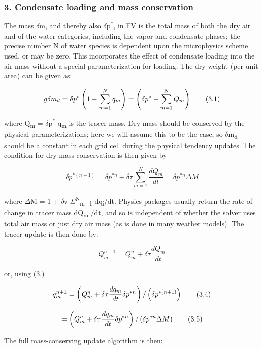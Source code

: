 \subsubsection*{3. Condensate loading and mass conservation}

The mass {$\delta$}m, and thereby also {$\delta$}p\textsuperscript{$\ast$}, in FV\textthreesuperior{} is the total mass of both the dry air and of the water categories, including the vapor and condensate phases; the precise number N of water species is dependent upon the microphysics scheme used, or may be zero. This incorporates the effect of condensate loading into the air mass without a special parameterization for loading. The dry weight (per unit area) can be given as\+:

\[ g \delta m_d = \delta p^* \left( 1 - \sum_{m=1}^N q_m \right) = \left( \delta p^* - \sum_{m=1}^N Q_m \right) \\ \tag {3.1} \]

where Q\textsubscript{m} = {$\delta$}p\textsuperscript{$\ast$} q\textsubscript{m} is the tracer mass. Dry mass should be conserved by the physical parameterizations; here we will assume this to be the case, so {$\delta$}m\textsubscript{d} should be a constant in each grid cell during the physical tendency updates. The condition for dry mass conservation is then given by

\[ \delta p^{*(n+1)} = \delta p^{*n} + \delta \tau \sum_{m=1}^N \frac{dQ_m}{dt} = \delta p^{*n} \Delta M \tag {3.2} \]

where {$\Delta$}M = 1 + {$\delta$}{$\tau$} {$\Sigma$}\textsuperscript{N}\textsubscript{m=1} dq\textsubscript{i}/dt. Physics packages usually return the rate of change in tracer mass dQ\textsubscript{m} /dt, and so is independent of whether the solver uses total air mass or just dry air mass (as is done in many weather models). The tracer update is then done by\+:

\[ Q^{n+1}_m = Q^n_m + \delta \tau \frac{dQ_m}{dt} \tag {3.3} \]

or, using (3.)

\[ q^{n+1}_m = \left( Q^n_m + \delta \tau \frac{dq_m}{dt} \delta p^{*n} \right) / \left( \delta p^{*(n+1)} \right) \\ \tag {3.4} \]

\[ = \left( Q^n_m + \delta \tau \frac{dq_m}{dt}\delta p^{*n} \right) / \left( \delta p^{*n} \Delta M \right) \\ \tag {3.5} \]

The full mass-\/conserving update algorithm is then\+:

